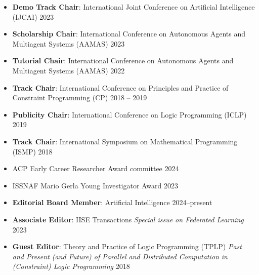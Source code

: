   \begin{itemize}

    \item {\bf Demo Track Chair}: 
    International Joint Conference on Artificial Intelligence (IJCAI)
    \hfill{2023}

    \item {\bf Scholarship Chair}: 
    International Conference on Autonomous Agents and Multiagent Systems (AAMAS)
    \hfill{2023}

    \item {\bf Tutorial Chair}: 
    International Conference on Autonomous Agents and Multiagent Systems (AAMAS)
    \hfill{2022}
    
  \item {\bf Track Chair}: 
  {International Conference on Principles and Practice of Constraint Programming (CP)}
    \hfill{2018 -- 2019}

  \item {\bf Publicity Chair}: {International Conference on Logic Programming (ICLP)}
  \hfill{2019}

  \item {\bf Track Chair}: {International Symposium on Mathematical Programming (ISMP)}
  \hfill{2018}
 
\end{itemize}


  \begin{itemize}
    \item ACP Early Career Researcher Award committee
    \hfill{2024}
    \item ISSNAF Mario Gerla Young Investigator Award 
    \hfill{2023}
  \end{itemize}

  \begin{itemize}
    \item {\bf Editorial Board Member}: Artificial Intelligence 
    \hfill{2024--present}

    \item {\bf Associate Editor}: IISE Transactions
    \emph{Special issue on Federated Learning} \hfill{2023}

  \item {\bf Guest Editor}: {Theory and Practice of Logic Programming (TPLP)}
  \emph{Past and Present (and Future) of Parallel and Distributed Computation in (Constraint) Logic Programming} 
  \hfill {2018}
\end{itemize}


